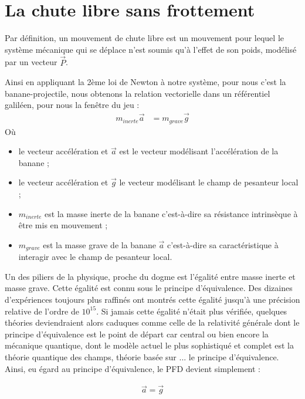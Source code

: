 \documentclass{tstextbook}
\begin{document}
\section{La chute libre sans frottement}
Par définition, un mouvement de chute libre est un mouvement pour lequel le système mécanique qui se déplace n'est soumis qu'à l'effet de son poids, modélisé par un vecteur $\vec{P}$.

Ainsi en appliquant la 2ème loi de Newton à notre système, pour nous c'est la banane-projectile, nous obtenons la relation vectorielle dans un référentiel galiléen, pour nous la fenêtre du jeu : 
\begin{align*}
m_{inerte} \vec{a} &= m_{grave} \vec{g} 
\end{align*}
Où  
\begin{itemize}
\item le vecteur accélération et $\vec{a}$ est le vecteur modélisant l'accélération de la banane ;
\item le vecteur accélération et $\vec{g}$ le vecteur modélisant le champ de pesanteur local ;
\item $m_{inerte}$ est la masse inerte de la banane c'est-à-dire sa résistance intrinsèque à être mis en mouvement ;
\item $m_{grave}$ est la masse grave de la banane $\vec{a}$ c'est-à-dire sa caractéristique à interagir avec le champ de pesanteur local.
\end{itemize}

Un des piliers de la physique, proche du dogme est l'égalité entre masse inerte et masse grave. Cette égalité est connu sous le principe d'équivalence. Des dizaines d'expériences toujours plus raffinés ont montrés cette égalité jusqu'à une précision relative de l'ordre de $10^{15}$. Si jamais cette égalité n'était plus vérifiée, quelques théories deviendraient alors caduques comme celle de la relativité générale dont le principe d'équivalence est le point de départ car central ou bien encore la mécanique quantique, dont le modèle actuel le plus sophistiqué et complet est la théorie quantique des champs, théorie basée sur ... le principe d'équivalence. \\

Ainsi, eu égard au principe d'équivalence, le PFD devient simplement :

\begin{align*}
\vec{a} = \vec{g}
\end{align*}
\end{document}
